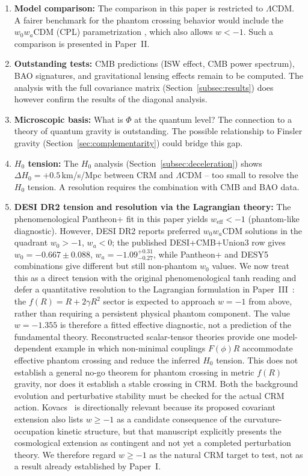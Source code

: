 \documentclass[aps,prd,twocolumn,superscriptaddress,nofootinbib]{revtex4-2}
\begin{document}
\begin{enumerate}
\item \textbf{Model comparison:} The comparison in this paper is restricted to $\Lambda$CDM. A fairer benchmark for the phantom crossing behavior would include the $w_0w_a$CDM (CPL) parametrization \cite{Chevallier2001, Linder2003}, which also allows $w < -1$. Such a comparison is presented in Paper~II.
\item \textbf{Outstanding tests:} CMB predictions (ISW effect, CMB power spectrum), BAO signatures, and gravitational lensing effects remain to be computed. The analysis with the full covariance matrix (Section~\ref{subsec:results}) does however confirm the results of the diagonal analysis.
\item \textbf{Microscopic basis:} What is $\Phi$ at the quantum level? The connection to a theory of quantum gravity is outstanding. The possible relationship to Finsler gravity (Section~\ref{sec:complementarity}) could bridge this gap.
\item \textbf{$H_0$ tension:} The $H_0$ analysis (Section~\ref{subsec:deceleration}) shows $\Delta H_0 = +0.5\,$km/s/Mpc between CRM and $\Lambda$CDM -- too small to resolve the $H_0$ tension. A resolution requires the combination with CMB and BAO data.
\item \textbf{DESI DR2 tension and resolution via the Lagrangian theory:} The phenomenological Pantheon+ fit in this paper yields $w_{\mathrm{eff}} < -1$ (phantom-like diagnostic). However, DESI DR2 \cite{DESI2025} reports preferred $w_0w_a$CDM solutions in the quadrant $w_0>-1$, $w_a<0$; the published DESI+CMB+Union3 row gives $w_0=-0.667\pm0.088$, $w_a=-1.09^{+0.31}_{-0.27}$, while Pantheon+ and DESY5 combinations give different but still non-phantom $w_0$ values. We now treat this as a direct tension with the original phenomenological tanh reading and defer a quantitative resolution to the Lagrangian formulation in Paper~III~\cite{Geiger2026c}: the $f(R) = R + 2\gamma R^2$ sector is expected to approach $w=-1$ from above, rather than requiring a persistent physical phantom component. The value $w=-1.355$ is therefore a fitted effective diagnostic, not a prediction of the fundamental theory. Reconstructed scalar-tensor theories \cite{Efstratiou2026} provide one model-dependent example in which non-minimal couplings $F(\phi)R$ accommodate effective phantom crossing and reduce the inferred $H_0$ tension. This does not establish a general no-go theorem for phantom crossing in metric $f(R)$ gravity, nor does it establish a stable crossing in CRM. Both the background evolution and perturbative stability must be checked for the actual CRM action. Kovacs~\cite{Kovacs2026} is directionally relevant because its proposed covariant extension also lists $w\geq -1$ as a candidate consequence of the curvature-occupation kinetic structure, but that manuscript explicitly presents the cosmological extension as contingent and not yet a completed perturbation theory. We therefore regard $w\geq -1$ as the natural CRM target to test, not as a result already established by Paper~I.
\end{enumerate}
\end{document}
